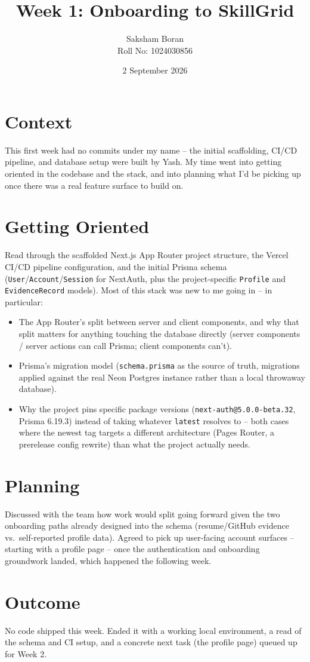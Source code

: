 \documentclass[11pt,a4paper]{article}
\title{\bfseries Week 1: Onboarding to SkillGrid}
\author{Saksham Boran \\ \small Roll No: 1024030856}
\date{2 September 2026}
\begin{document}
\maketitle

\section{Context}
This first week had no commits under my name -- the initial
scaffolding, CI/CD pipeline, and database setup were built by
Yash. My time went into getting oriented in the codebase and the
stack, and into planning what I'd be picking up once there was a
real feature surface to build on.

\section{Getting Oriented}
Read through the scaffolded Next.js App Router project structure,
the Vercel CI/CD pipeline configuration, and the initial Prisma
schema (\texttt{User}/\texttt{Account}/\texttt{Session} for
NextAuth, plus the project-specific \texttt{Profile} and
\texttt{EvidenceRecord} models). Most of this stack was new to me
going in -- in particular:
\begin{itemize}[leftmargin=0.7cm]
  \item The App Router's split between server and client
    components, and why that split matters for anything touching
    the database directly (server components / server actions can
    call Prisma; client components can't).
  \item Prisma's migration model (\texttt{schema.prisma} as the
    source of truth, migrations applied against the real Neon
    Postgres instance rather than a local throwaway database).
  \item Why the project pins specific package versions
    (\texttt{next-auth@5.0.0-beta.32}, Prisma 6.19.3) instead of
    taking whatever \texttt{latest} resolves to -- both cases
    where the newest tag targets a different architecture
    (Pages Router, a prerelease config rewrite) than what the
    project actually needs.
\end{itemize}

\section{Planning}
Discussed with the team how work would split going forward given
the two onboarding paths already designed into the schema
(resume/GitHub evidence vs.\ self-reported profile data). Agreed
to pick up user-facing account surfaces -- starting with a profile
page -- once the authentication and onboarding groundwork landed,
which happened the following week.

\section{Outcome}
No code shipped this week. Ended it with a working local
environment, a read of the schema and CI setup, and a concrete
next task (the profile page) queued up for Week 2.
\end{document}
